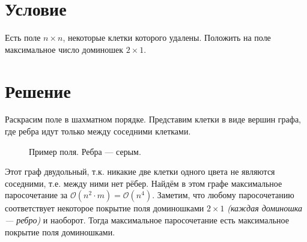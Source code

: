 

\cfoot{}



\section*{Условие}

Есть поле \(n \times n\), некоторые клетки которого удалены. Положить на поле максимальное число доминошек \(2 \times 1\).

\section*{Решение}

Раскрасим поле в шахматном порядке. Представим клетки в виде вершин графа, где ребра идут только между соседними клетками.

\begin{figure}[h]
    \centering
    
    \caption{Пример поля. Ребра --- серым.}
\end{figure}

Этот граф двудольный, т.к. никакие две клетки одного цвета не являются соседними, т.е. между ними нет рёбер. Найдём в этом графе максимальное паросочетание за \(\mathcal{O}(n^2 \cdot m) = \mathcal{O}(n^4)\). Заметим, что любому паросочетанию соответствует некоторое покрытие поля доминошками \(2 \times 1\) \textit{(каждая доминошка --- ребро)} и наоборот. Тогда максимальное паросочетание есть максимальное покрытие поля доминошками.

